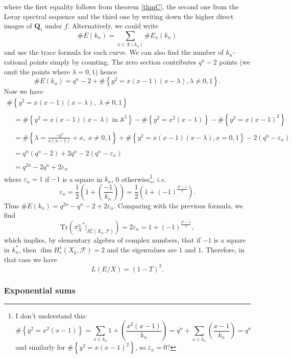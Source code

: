 where the first equality follows from theorem \ref{thmC}, the second one from the Leray spectral sequence and the third one by writing down the higher direct images of $\mathbf{Q}_\ell$ under $f$. Alternatively, we could write 
$$
\#E(k_n) = \sum_{x \in X(k_n)} \#E_x(k_n)
$$
and use the trace formula for each curve. We can also find the number of $k_n$-rational points simply by counting. The zero section contributes $q^n -2$ points (we omit the points where $\lambda = 0, 1$) hence
$$
\# E(k_n) =  q^n-2 + \#\left\{y^2 = x(x-1)(x-\lambda), \lambda\neq 0, 1\right\}.
$$
Now we have
$$
\begin{array}{l}
 \#\left\{y^2 = x(x-1)(x-\lambda), \; \lambda\neq 0, 1\right\}\\
 \\
 \quad =  \#\left\{y^2 = x(x-1)(x-\lambda)\text{ in }\mathbb A^3\right\} -\#\left\{y^2 = x^2(x-1)\right\}-\#\left\{y^2 = x(x-1)^2\right\}\\
 \\
 \quad =  \#\left\{\lambda=\frac{-y^2}{x(x-1)}+x, \; x\neq 0, 1\right\} + \#\left\{y^2 = x(x-1)(x-\lambda), x=0, 1\right\}-2(q^n-\varepsilon_n) \\
 \\
 \quad =  q^n(q^n-2)+2q^n-2(q^n-\varepsilon_n)\\
 \\
 \quad =  q^{2n}-2q^n+2\varepsilon_n
\end{array}
$$
where $\varepsilon_n = 1$ if $-1$ is a square in $k_n$, 0 otherwise\footnote{I don't understand this: 
 $$
\#\left\{y^2 = x^2(x-1)\right\} = \sum_{x \in k_n} 1+\left(\frac{x^2(x-1)}{k_n}\right) = q^n+\sum_{x \in k_n} \left(\frac{x-1}{k_n}\right) = q^n
 $$
and similarly for $\#\left\{y^2 = x(x-1)^2\right\}$, so $\varepsilon_n = 0$?}, {\it i.e.} 
$$
\varepsilon_n = \frac{1}{2}\left(1+\left(\frac{-1}{k_n}\right)\right) = \frac{1}{2}\left(1+(-1)^{\frac{q^n-1}{2}}\right).
$$
Thus $ \# E(k_n) =  q^{2n}-q^n-2+ 2\varepsilon_n$. Comparing with the previous formula, we find
$$
\text{Tr}\left({\pi_X^n}^*\big|_{H_c^1(X_{\bar k}, \mathcal{F})}\right) = 2 \varepsilon_n =  1+(-1)^{\frac{q^n-1}{2}},
$$
which implies, by elementary algebra of complex numbers, that if $-1$ is a square in $k_n^*$, then $\dim H_c^1(X_{\bar k}, \mathcal{F}) = 2$ and the eigenvalues are $1$ and $1$. Therefore, in that case we have
 $$L(E/X) = (1-T)^2.$$

\subsubsection*{Exponential sums}

